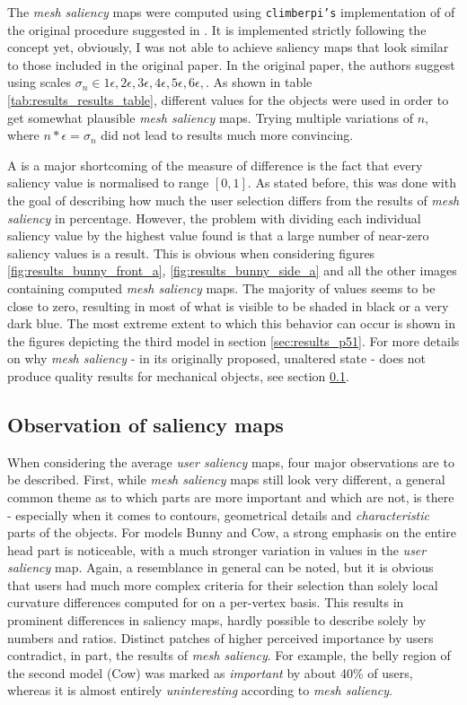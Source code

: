 The \textit{mesh saliency} maps were computed using \texttt{climberpi's} implementation \cite{clms} of of the original procedure suggested in \cite{lee2005mesh}. It is implemented strictly following the concept yet, obviously, I was not able to achieve saliency maps that look similar to those included in the original paper. In the original paper, the authors suggest using scales $\sigma_{n} \in {1\epsilon, 2\epsilon, 3\epsilon, 4\epsilon, 5\epsilon, 6\epsilon, }$. As shown in table \ref{tab:results_results_table}, different values for the objects were used in order to get somewhat plausible \textit{mesh saliency} maps. Trying multiple variations of $n$, where $n*\epsilon = \sigma_{n}$ did not lead to results much more convincing.

A is a major shortcoming of the measure of difference is the fact that every saliency value is normalised to range $[0, 1]$. As stated before, this was done with the goal of describing how much the user selection differs from the results of \textit{mesh saliency} in percentage. However, the problem with dividing each individual saliency value by the highest value found is that a large number of near-zero saliency values is a result. This is obvious when considering figures \ref{fig:results_bunny_front_a}, \ref{fig:results_bunny_side_a} and all the other images containing computed \textit{mesh saliency} maps. The majority of values seems to be close to zero, resulting in most of what is visible to be shaded in black or a very dark blue. The most extreme extent to which this behavior can occur is shown in the figures depicting the third model in section \ref{sec:results_p51}. For more details on why \textit{mesh saliency} - in its originally proposed, unaltered state - does not produce quality results for mechanical objects, see section \ref{sec:mesh_saliency_with_mechanical_objects}.

		\subsection{Observation of saliency maps}
		\label{sec:mesh_saliency_with_mechanical_objects}
When considering the average \textit{user saliency} maps, four major observations are to be described. First, while \textit{mesh saliency} maps still look very different, a general common theme as to which parts are more important and which are not, is there - especially when it comes to contours, geometrical details and \textit{characteristic} parts of the objects. For models Bunny and Cow, a strong emphasis on the entire head part is noticeable, with a much stronger variation in values in the \textit{user saliency} map. Again, a resemblance in general can be noted, but it is obvious that users had much more complex criteria for their selection than solely local curvature differences computed for on a per-vertex basis. This results in prominent differences in saliency maps, hardly possible to describe solely by numbers and ratios. Distinct patches of higher perceived importance by users contradict, in part, the results of \textit{mesh saliency}. For example, the belly region of the second model (Cow) was marked as \textit{important} by about 40\% of users, whereas it is almost entirely \textit{uninteresting} according to \textit{mesh saliency}.

